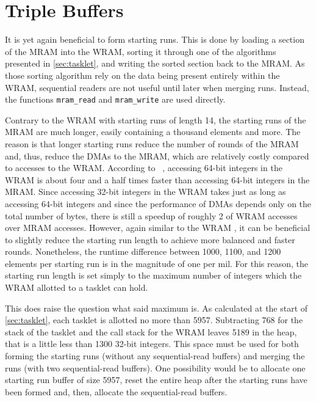 \section{Triple Buffers}
\label{sec:mram:triple}

It is yet again beneficial to form starting runs.
This is done by loading a section of the MRAM into the WRAM, sorting it through one of the algorithms presented in \cref{sec:tasklet}, and writing the sorted section back to the MRAM.
As those sorting algorithm rely on the data being present entirely within the WRAM, sequential readers are not useful until later when merging runs.
Instead, the functions \lstinline|mram_read| and \lstinline|mram_write| are used directly.

Contrary to the WRAM \MS{} with starting runs of length 14, the starting runs of the MRAM \MS{} are much longer, easily containing a thousand elements and more.
The reason is that longer starting runs reduce the number of rounds of the MRAM \MS{} and, thus, reduce the DMAs to the MRAM, which are relatively costly compared to accesses to the WRAM.
According to \citeauthor{mutlu2022Benchmarking}~\cite[8\psq]{mutlu2022Benchmarking}, accessing 64-bit integers in the WRAM is about four and a half times faster than accessing 64-bit integers in the MRAM.
Since accessing 32-bit integers in the WRAM takes just as long as accessing 64-bit integers and since the performance of DMAs depends only on the total number of bytes, there is still a speedup of roughly 2 of WRAM accesses over MRAM accesses.
However, again similar to the WRAM \MS{}, it can be beneficial to slightly reduce the starting run length to achieve more balanced and faster rounds.
Nonetheless, the runtime difference between 1000, 1100, and 1200 elements per starting run is in the magnitude of one per mil.
For this reason, the starting run length is set simply to the maximum number of integers which the WRAM allotted to a tasklet can hold.

This does raise the question what said maximum is.
As calculated at the start of \cref{sec:tasklet}, each tasklet is allotted no more than \qty{5957}{\byte}.
Subtracting \qty{768}{\byte} for the stack of the tasklet and the call stack for the WRAM \QS{} leaves \qty{5189}{\byte} in the heap, that is a little less than 1300 32-bit integers.
This space must be used for both forming the starting runs (without any sequential-read buffers) and merging the runs (with two sequential-read buffers).
One possibility would be to allocate one starting run buffer of size \qty{5957}{\byte}, reset the entire heap after the starting runs have been formed and, then, allocate the sequential-read buffers.

